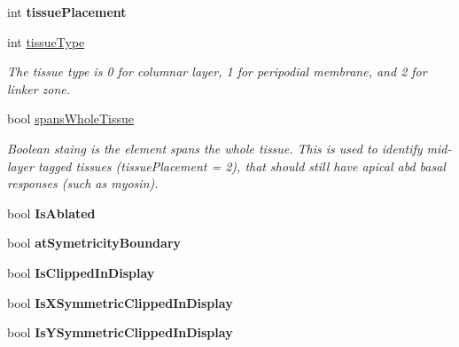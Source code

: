\begin{DoxyCompactItemize}
\item 
\hypertarget{classShapeBase_aff63b1fcb823bbfdb5b19fe78dea59b8}{}int {\bfseries tissue\+Placement}\label{classShapeBase_aff63b1fcb823bbfdb5b19fe78dea59b8}

\item 
\hypertarget{classShapeBase_a1d56f7eb3fed744adc268bc4da7a790f}{}int \hyperlink{classShapeBase_a1d56f7eb3fed744adc268bc4da7a790f}{tissue\+Type}\label{classShapeBase_a1d56f7eb3fed744adc268bc4da7a790f}

\begin{DoxyCompactList}\small\item\em The tissue type is 0 for columnar layer, 1 for peripodial membrane, and 2 for linker zone. \end{DoxyCompactList}\item 
\hypertarget{classShapeBase_adafe85bbee6173d2a321408cd8b63db3}{}bool \hyperlink{classShapeBase_adafe85bbee6173d2a321408cd8b63db3}{spans\+Whole\+Tissue}\label{classShapeBase_adafe85bbee6173d2a321408cd8b63db3}

\begin{DoxyCompactList}\small\item\em Boolean staing is the element spans the whole tissue. This is used to identify mid-\/layer tagged tissues (tissue\+Placement = 2), that should still have apical abd basal responses (such as myosin). \end{DoxyCompactList}\item 
\hypertarget{classShapeBase_a4f09d39d079bfe95ea7c25f5d3de6c09}{}bool {\bfseries Is\+Ablated}\label{classShapeBase_a4f09d39d079bfe95ea7c25f5d3de6c09}

\item 
\hypertarget{classShapeBase_a3d15f14d23230682242ed063872617af}{}bool {\bfseries at\+Symetricity\+Boundary}\label{classShapeBase_a3d15f14d23230682242ed063872617af}

\item 
\hypertarget{classShapeBase_a6f5e25bc9b4376c0aa28aec59af6cf2f}{}bool {\bfseries Is\+Clipped\+In\+Display}\label{classShapeBase_a6f5e25bc9b4376c0aa28aec59af6cf2f}

\item 
\hypertarget{classShapeBase_ad58b945ab4de36d2ab56b8a33fd10c20}{}bool {\bfseries Is\+X\+Symmetric\+Clipped\+In\+Display}\label{classShapeBase_ad58b945ab4de36d2ab56b8a33fd10c20}

\item 
\hypertarget{classShapeBase_ab7376a727388707fc2502490701e48a0}{}bool {\bfseries Is\+Y\+Symmetric\+Clipped\+In\+Display}\label{classShapeBase_ab7376a727388707fc2502490701e48a0}


\end{DoxyCompactItemize}
